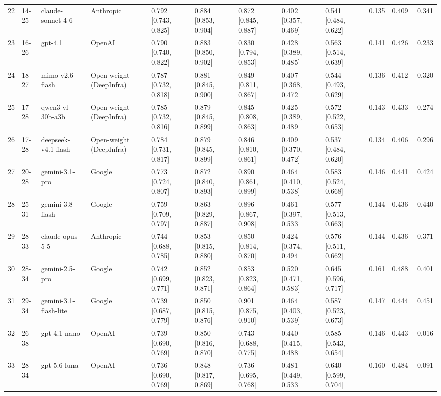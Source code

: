 \begin{table}
\begin{tabular}{rllllllllrrr}
22 & 14-25 & claude-sonnet-4-6 & Anthropic & 0.792 [0.743, 0.825] & 0.884 [0.853, 0.904] & 0.872 [0.845, 0.887] & 0.402 [0.357, 0.469] & 0.541 [0.484, 0.622] & 0.135 & 0.409 & 0.341 \\
23 & 16-26 & gpt-4.1 & OpenAI & 0.790 [0.740, 0.822] & 0.883 [0.850, 0.902] & 0.830 [0.794, 0.853] & 0.428 [0.389, 0.485] & 0.563 [0.514, 0.639] & 0.141 & 0.426 & 0.233 \\
24 & 18-27 & mimo-v2.6-flash & Open-weight (DeepInfra) & 0.787 [0.732, 0.818] & 0.881 [0.845, 0.900] & 0.849 [0.811, 0.867] & 0.407 [0.368, 0.472] & 0.544 [0.493, 0.629] & 0.136 & 0.412 & 0.320 \\
25 & 17-28 & qwen3-vl-30b-a3b & Open-weight (DeepInfra) & 0.785 [0.732, 0.816] & 0.879 [0.845, 0.899] & 0.845 [0.808, 0.863] & 0.425 [0.389, 0.489] & 0.572 [0.522, 0.653] & 0.143 & 0.433 & 0.274 \\
26 & 17-28 & deepseek-v4.1-flash & Open-weight (DeepInfra) & 0.784 [0.731, 0.817] & 0.879 [0.845, 0.899] & 0.846 [0.810, 0.861] & 0.409 [0.370, 0.472] & 0.537 [0.484, 0.620] & 0.134 & 0.406 & 0.296 \\
27 & 20-28 & gemini-3.1-pro & Google & 0.773 [0.724, 0.807] & 0.872 [0.840, 0.893] & 0.890 [0.861, 0.899] & 0.464 [0.410, 0.538] & 0.583 [0.524, 0.668] & 0.146 & 0.441 & 0.424 \\
28 & 25-31 & gemini-3.8-flash & Google & 0.759 [0.709, 0.797] & 0.863 [0.829, 0.887] & 0.896 [0.867, 0.908] & 0.461 [0.397, 0.533] & 0.577 [0.513, 0.663] & 0.144 & 0.436 & 0.440 \\
29 & 28-33 & claude-opus-5-5 & Anthropic & 0.744 [0.688, 0.785] & 0.853 [0.815, 0.880] & 0.850 [0.814, 0.870] & 0.424 [0.374, 0.494] & 0.576 [0.511, 0.662] & 0.144 & 0.436 & 0.371 \\
30 & 28-34 & gemini-2.5-pro & Google & 0.742 [0.699, 0.771] & 0.852 [0.823, 0.871] & 0.853 [0.823, 0.864] & 0.520 [0.471, 0.583] & 0.645 [0.596, 0.717] & 0.161 & 0.488 & 0.401 \\
31 & 29-34 & gemini-3.1-flash-lite & Google & 0.739 [0.687, 0.779] & 0.850 [0.815, 0.876] & 0.901 [0.875, 0.910] & 0.464 [0.403, 0.539] & 0.587 [0.523, 0.673] & 0.147 & 0.444 & 0.451 \\
32 & 26-38 & gpt-4.1-nano & OpenAI & 0.739 [0.690, 0.769] & 0.850 [0.816, 0.870] & 0.743 [0.688, 0.775] & 0.440 [0.415, 0.488] & 0.585 [0.543, 0.654] & 0.146 & 0.443 & -0.016 \\
33 & 28-34 & gpt-5.6-luna & OpenAI & 0.736 [0.690, 0.769] & 0.848 [0.817, 0.869] & 0.736 [0.695, 0.768] & 0.481 [0.449, 0.533] & 0.640 [0.599, 0.704] & 0.160 & 0.484 & 0.091 \\

\end{tabular}
\end{table}
